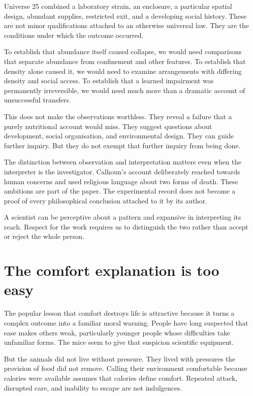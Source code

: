 \documentclass[12pt,a4paper]{book}
\begin{document}
Universe 25 combined a laboratory strain, an enclosure, a particular spatial design, abundant supplies, restricted exit, and a developing social history. These are not minor qualifications attached to an otherwise universal law. They are the conditions under which the outcome occurred.

To establish that abundance itself caused collapse, we would need comparisons that separate abundance from confinement and other features. To establish that density alone caused it, we would need to examine arrangements with differing density and social access. To establish that a learned impairment was permanently irreversible, we would need much more than a dramatic account of unsuccessful transfers.

This does not make the observations worthless. They reveal a failure that a purely nutritional account would miss. They suggest questions about development, social organisation, and environmental design. They can guide further inquiry. But they do not exempt that further inquiry from being done.

The distinction between observation and interpretation matters even when the interpreter is the investigator. Calhoun's account deliberately reached towards human concerns and used religious language about two forms of death. These ambitions are part of the paper. The experimental record does not become a proof of every philosophical conclusion attached to it by its author.

A scientist can be perceptive about a pattern and expansive in interpreting its reach. Respect for the work requires us to distinguish the two rather than accept or reject the whole person.

\section*{The comfort explanation is too easy}

The popular lesson that comfort destroys life is attractive because it turns a complex outcome into a familiar moral warning. People have long suspected that ease makes others weak, particularly younger people whose difficulties take unfamiliar forms. The mice seem to give that suspicion scientific equipment.

But the animals did not live without pressure. They lived with pressures the provision of food did not remove. Calling their environment comfortable because calories were available assumes that calories define comfort. Repeated attack, disrupted care, and inability to escape are not indulgences.
\end{document}
